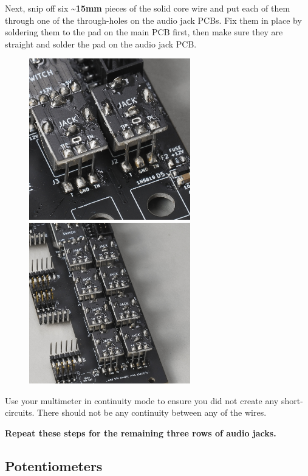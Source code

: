 \documentclass[12pt, a4paper]{article}
\begin{document}
Next, snip off six \textbf{\textasciitilde15mm} pieces of the solid core wire and put each of them
through one of the through-holes on the audio jack PCBs. Fix them in place by soldering them to
the pad on the main PCB first, then make sure they are straight and solder the pad on the audio
jack PCB.

\begin{figure}[H]
    \centering
    \includegraphics[width=7cm]{images/32_04_jacks_wire_soldered_top.jpg}
    \hspace{2mm}
    \includegraphics[width=7cm]{images/32_05_all_jacks_soldered.jpg}
\end{figure}

Use your multimeter in continuity mode to ensure you did not create any short-circuits. There
should not be any continuity between any of the wires.

\textbf{Repeat these steps for the remaining three rows of audio jacks.}

\pagebreak
\subsection{Potentiometers}
\end{document}

